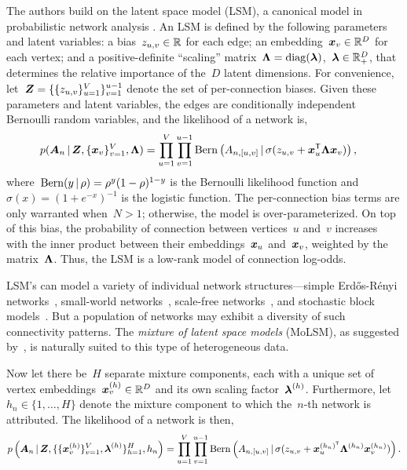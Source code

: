 The authors build on the latent space model (LSM), a canonical model
in probabilistic network analysis \citep{hoff2002latent,
  hoff2008modeling}. An LSM is defined by the following parameters and
latent variables: a bias~${z_{u,v} \in \mathbb{R}}$ for each edge; an
embedding~${\boldsymbol{x}_v \in \mathbb{R}^D}$ for each vertex; and a
positive-definite ``scaling''
matrix~${\boldsymbol{\Lambda} = \operatorname{diag}(\boldsymbol{\lambda})}$,~$\boldsymbol{\lambda} \in \mathbb{R}_+^D$, that
determines the relative importance of the~$D$ latent dimensions.  For
convenience, let~${\boldsymbol{Z} = \{\{z_{u,v}\}_{u=1}^V\}_{v=1}^{u-1}}$ denote
the set of per-connection biases.  Given these parameters and latent
variables, the edges are conditionally independent Bernoulli random
variables, and the likelihood of a network is,
\begin{align}
  p(\boldsymbol{A}_{n} \, | \, \boldsymbol{Z}, \{\boldsymbol{x}_v\}_{v=1}^V, \boldsymbol{\Lambda})
  &= \prod_{u=1}^V \prod_{v=1}^{u-1} \mathrm{Bern} \left(A_{n, [u,v]} \, | \,
    \sigma(z_{u,v} + \boldsymbol{x}_u^{\mathsf{T}} \boldsymbol{\Lambda} \boldsymbol{x}_v)\right),
\end{align}
where~${\mathrm{Bern}(y \, | \, \rho) = \rho^y (1-\rho)^{1-y}}$ is the Bernoulli likelihood function
and~${\sigma(x) = (1+e^{-x})^{-1}}$ is the logistic function.
The per-connection bias terms are only warranted
when~${N > 1}$; otherwise, the model is over-parameterized.
On top of this bias, the probability of connection between vertices~$u$
and~$v$ increases with the inner product between their embeddings~$\boldsymbol{x}_u$
and~$\boldsymbol{x}_v$, weighted by the matrix~$\boldsymbol{\Lambda}$. Thus, the LSM is a low-rank model of connection log-odds.

LSM's can model a variety of individual network structures---simple
Erd\H{o}s-R\'{e}nyi networks~\citep{erdos1959random}, small-world
networks~\citep{watts1998collective}, scale-free
networks~\citep{barabasi1999emergence}, and stochastic block
models~\citep{nowicki2001estimation}.  But a
population of networks may exhibit a diversity of such connectivity
patterns.  The \emph{mixture of latent space models} (MoLSM), as suggested
by~\citet{durante2016nonparametric}, is naturally suited to this type
of heterogeneous data.

Now let there
be~$H$ separate mixture components, each with 
a unique set of vertex embeddings~${\boldsymbol{x}_v^{(h)} \in \mathbb{R}^D}$
and its own scaling factor~$\boldsymbol{\lambda}^{(h)}$. Furthermore,
let~${h_n \in \{1, \ldots, H\}}$ denote the mixture component
to which the~$n$-th network is attributed. 
The likelihood of a network is then,
\begin{align}
  \label{eq:molsm_lkhd}
  p \left(\boldsymbol{A}_n \, | \,
    \boldsymbol{Z}, \{\{\boldsymbol{x}_v^{(h)}\}_{v=1}^V,
  \boldsymbol{\lambda}^{(h)}\}_{h=1}^H, h_n \right) 
  = \prod_{u=1}^V \prod_{v=1}^{u-1}
  \mathrm{Bern} \left(A_{n,[u,v]} \, | \,
    \sigma(z_{u,v} + \boldsymbol{x}_{u}^{(h_n)^{\mathsf{T}}} \boldsymbol{\Lambda}^{(h_n)} \boldsymbol{x}_v^{(h_n)}) \right).
\end{align}

